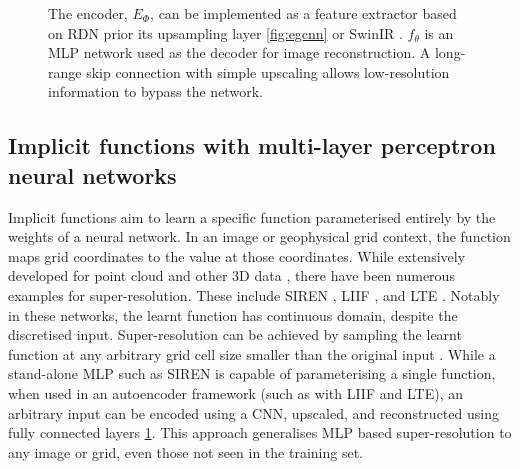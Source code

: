 \documentclass{article}
\begin{document}
\begin{figure}[hbt]
    \caption[An example deep learning Multi-layer Perceptron]{
        The encoder, $E_\Phi$, can be implemented as a feature extractor based on RDN prior its upsampling layer \cref{fig:egcnn} or SwinIR \parencite[per][]{leeLocalTextureEstimator2022}.
        $f_\theta$ is an MLP network used as the decoder for image reconstruction.
        A long-range skip connection with simple upscaling allows low-resolution information to bypass the network.
        }
    \label{fig:egmlp}
\end{figure}

\subsection{Implicit functions with multi-layer perceptron neural networks}
Implicit functions aim to learn a specific function parameterised entirely by the weights of a neural network.
In an image or geophysical grid context, the function maps grid coordinates to the value at those coordinates.
While extensively developed for point cloud and other 3D data \parencite[e.g.][]{jiangLocalImplicitGrid2020}, there have been numerous examples for super-resolution.
These include SIREN \parencite{sitzmann2019siren}, LIIF \parencite{chenLearningContinuousImage2021}, and LTE \parencite{leeLocalTextureEstimator2022}.
Notably in these networks, the learnt function has continuous domain, despite the discretised input.
Super-resolution can be achieved by sampling the learnt function at any arbitrary grid cell size smaller than the original input \parencite{chenLearningContinuousImage2021}.
While a stand-alone MLP such as SIREN is capable of parameterising a single function, when used in an autoencoder framework (such as with LIIF and LTE), an arbitrary input can be encoded using a CNN, upscaled, and reconstructed using fully connected layers \cref{fig:egmlp}.
This approach generalises MLP based super-resolution to any image or grid, even those not seen in the training set.
\end{document}
